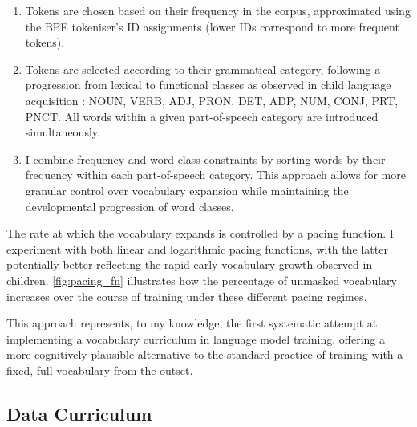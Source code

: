 \begin{enumerate}
    \item {} Tokens are chosen based on their frequency in the corpus, approximated using the BPE tokeniser's ID assignments (lower IDs correspond to more frequent tokens).
    
    \item {} Tokens are selected according to their grammatical category, following a progression from lexical to functional classes as observed in child language acquisition \citep{bergelson2015early}: NOUN, VERB, ADJ, PRON, DET, ADP, NUM, CONJ, PRT, PNCT. All words within a given part-of-speech category are introduced simultaneously.
    
    \item {} I combine frequency and word class constraints by sorting words by their frequency within each part-of-speech category. This approach allows for more granular control over vocabulary expansion while maintaining the developmental progression of word classes.
\end{enumerate}

The rate at which the vocabulary expands is controlled by a pacing function. I experiment with both linear and logarithmic pacing functions, with the latter potentially better reflecting the rapid early vocabulary growth observed in children. \cref{fig:pacing_fn} illustrates how the percentage of unmasked vocabulary increases over the course of training under these different pacing regimes.


This approach represents, to my knowledge, the first systematic attempt at implementing a vocabulary curriculum in language model training, offering a more cognitively plausible alternative to the standard practice of training with a fixed, full vocabulary from the outset.


\newpage
\subsection{Data Curriculum}
\label{subsec:data-cl}

